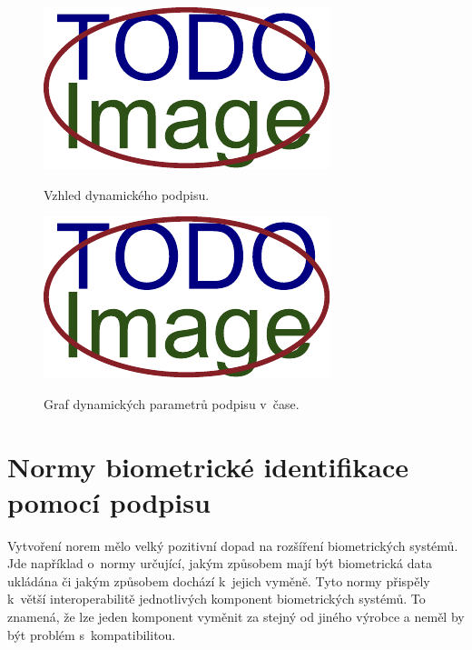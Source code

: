 \begin{figure}[h]
  \centering
  \begin{minipage}{0.45\textwidth}\label{fig:first-image}
      \centering
      \includegraphics[width=\textwidth]{obrazky-figures/placeholder.pdf}
      \caption{Vzhled dynamického podpisu.}
  \end{minipage}\hfill
  \begin{minipage}{0.45\textwidth}\label{fig:second-image}
      \centering
      \includegraphics[width=\textwidth]{obrazky-figures/placeholder.pdf}
      \caption{Graf dynamických parametrů podpisu v~čase.}
  \end{minipage}
\end{figure}

\section{Normy biometrické identifikace pomocí podpisu}

Vytvoření norem mělo velký pozitivní dopad na rozšíření biometrických systémů.                                                %
Jde například o~normy určující, jakým způsobem mají být biometrická data ukládána či jakým způsobem dochází k~jejich vyměně.  %
Tyto normy přispěly k~větší interoperabilitě jednotlivých komponent biometrických systémů.                                    %
To znamená, že lze jeden komponent vyměnit za stejný od jiného výrobce a neměl by být problém s~kompatibilitou.~\cite{DrahanskýMartin2011}%
\newline 

